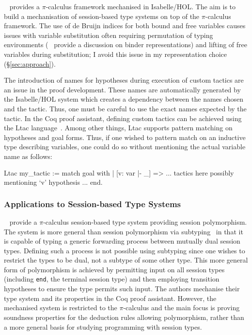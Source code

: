 \citeauthor{Gay:2001:FFP}~\cite{Gay:2001:FFP} provides a $\pi$-calculus
framework mechanised in Isabelle/HOL. The aim is to build a mechanisation of
session-based type systems on top of the $\pi$-calculus framework. The use of
de Bruijn indices for both bound and free variables causes issues with
variable substitution often requiring permutation of typing environments
(\citeauthor{Aydemir:2008:EFM}~\cite{Aydemir:2008:EFM} provide a discussion on
binder representations) and lifting of free variables during substitution; I
avoid this issue in my representation choice (\S \ref{sec:approach}).

The introduction of names for hypotheses during execution of custom tactics
are an issue in the proof development. These names are automatically generated
by the Isabelle/HOL system which creates a dependency between the names chosen
and the tactic. Thus, one must be careful to use the exact names expected by
the tactic. In the Coq proof assistant, defining custom tactics can be
achieved using the Ltac language~\cite{Delahaye:2000:TLS}. Among other things,
Ltac supports pattern matching on hypotheses and goal forms. Thus, if one
wished to pattern match on an inductive type describing variables, one could
do so without mentioning the actual variable name as follows:

\begin{coq}
Ltac my_tactic :=
  match goal with
  | [v: var |- _] =>
    ... tactics here possibly mentioning `v' hypothesis ...
  end.
\end{coq}

\subsubsection{Applications to Session-based Type Systems}\label{sec:asts}

\citeauthor{Goto:2014}~\cite{Goto:2014} provide a $\pi$-calculus session-based
type system providing session polymorphism. The system is more general than
session polymorphism via subtyping~\cite{Gay:2005:SST} in that it is capable
of typing a generic forwarding process between mutually dual session
types. Defining such a process is not possible using subtyping since one
wishes to restrict the types to be dual, not a subtype of some other
type. This more general form of polymorphism is achieved by permitting input
on all session types (including \lstinline{end}, the terminal session type)
and then employing transition hypotheses to ensure the type permits such
input. The authors mechanise their type system and its properties in the Coq
proof assistant. However, the mechanised system is restricted to the
$\pi$-calculus and the main focus is proving soundness properties for the
deduction rules allowing polymorphism, rather than a more general basis for
studying programming with session types.
